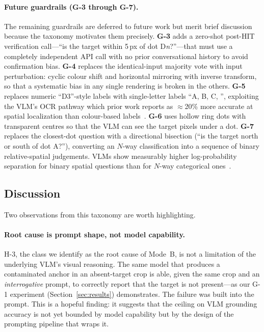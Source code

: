 \paragraph{Future guardrails (G-3 through G-7).}
The remaining guardrails are deferred to future work but merit brief
discussion because the taxonomy motivates them precisely.
\textbf{G-3} adds a zero-shot post-HIT verification call---``is the
target within 5\,px of dot D\textit{n}?''---that must use a completely
independent API call with no prior conversational history to avoid
confirmation bias.  \textbf{G-4} replaces the identical-input
majority vote with input perturbation: cyclic colour shift and
horizontal mirroring with inverse transform, so that a systematic
bias in any single rendering is broken in the others.  \textbf{G-5}
replaces numeric ``D3''-style labels with single-letter labels
``A, B, C, \textellipsis'', exploiting the VLM's OCR pathway which
prior work reports as $\approx$20\% more accurate at spatial
localization than colour-based labels~\cite{you2023ferret}.
\textbf{G-6} uses hollow ring dots with transparent centres so that
the VLM can see the target pixels under a dot.  \textbf{G-7}
replaces the closest-dot question with a directional bisection
(``is the target north or south of dot A?''), converting an $N$-way
classification into a sequence of binary relative-spatial
judgements.  VLMs show measurably higher log-probability separation
for binary spatial questions than for $N$-way categorical
ones~\cite{seeclick, showui}.

\subsection{Discussion}

Two observations from this taxonomy are worth highlighting.

\paragraph{Root cause is prompt shape, not model capability.}
H-3, the class we identify as the root cause of Mode~B, is not a
limitation of the underlying VLM's visual reasoning.  The same model
that produces a contaminated anchor in an absent-target crop is able,
given the same crop and an \emph{interrogative} prompt, to correctly
report that the target is not present---as our G-1 experiment
(Section~\ref{sec:results}) demonstrates.  The failure was built into
the prompt.  This is a hopeful finding: it suggests that the ceiling
on VLM grounding accuracy is not yet bounded by model capability but
by the design of the prompting pipeline that wraps it.


